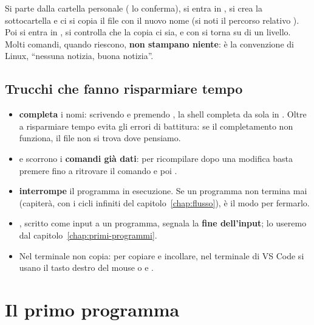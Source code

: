 Si parte dalla cartella personale ( lo conferma), si entra in
, si crea la sottocartella  e ci si
copia il file  con il nuovo nome  (si noti il
percorso relativo ). Poi si entra in
, si controlla che la copia ci sia, e con  si
torna su di un livello. Molti comandi, quando riescono, \textbf{non
stampano niente}: è la convenzione di Linux, “nessuna notizia, buona
notizia”.


\subsection{Trucchi che fanno risparmiare tempo}

\begin{itemize}
  \item {} \textbf{completa} i nomi: scrivendo  e
        premendo , la shell completa da sola in
        . Oltre a risparmiare tempo evita gli
        errori di battitura: se il completamento non funziona, il file non
        si trova dove pensiamo.
  \item \tasto{$\uparrow$} e \tasto{$\downarrow$} scorrono i \textbf{comandi già dati}: per
        ricompilare dopo una modifica basta premere \tasto{$\uparrow$} fino a
        ritrovare il comando  e poi .
  \item {} \textbf{interrompe} il programma in esecuzione. Se un
        programma non termina mai (capiterà, con i cicli infiniti del
        capitolo~\ref{chap:flusso}), è il modo per fermarlo.
  \item {}, scritto come input a un programma, segnala la
        \textbf{fine dell'input}; lo useremo dal
        capitolo~\ref{chap:primi-programmi}.
  \item Nel terminale  non copia: per copiare e incollare,
        nel terminale di VS Code si usano il tasto destro del mouse o
         e .
\end{itemize}

\section{Il primo programma}

